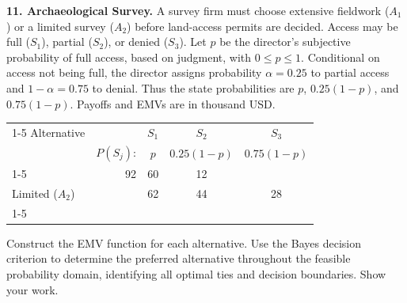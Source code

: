 \noindent\begin{minipage}[t][0.48\textheight][t]{\textwidth}
\textbf{11. Archaeological Survey.} A survey firm must choose extensive fieldwork ($A_1$) or a limited survey
($A_2$) before land-access permits are decided. Access may be full ($S_1$),
partial ($S_2$), or denied ($S_3$). Let $p$ be the director's subjective
probability of full access, based on judgment, with $0\leq p\leq1$.
Conditional on access not being full, the director assigns probability
$\alpha=0.25$ to partial access and $1-\alpha=0.75$ to denial.
Thus the state probabilities are $p$, $0.25(1-p)$, and $0.75(1-p)$.
Payoffs and EMVs are in thousand USD.

\begin{center}
		\renewcommand{\arraystretch}{1.3}
		\small
		\begin{tabular}{lr@{\qquad}ccc}
			\cmidrule{1-5}
			Alternative & & $S_1$ & $S_2$ & $S_3$ \\
			& $P(S_j)$: & $p$ & $0.25(1-p)$ & $0.75(1-p)$ \\
			\cmidrule{1-5}
			\multicolumn{2}{l}{Extensive ($A_1$)} & 92 & 60 & 12 \\
			\multicolumn{2}{l}{Limited ($A_2$)} & 62 & 44 & 28 \\
			\cmidrule{1-5}
		\end{tabular}
	\end{center}

Construct the EMV function for each alternative. Use the Bayes decision criterion to determine the preferred alternative throughout the feasible probability domain, identifying all optimal ties and decision boundaries. Show your work.
\par\vfill
\end{minipage}\par


